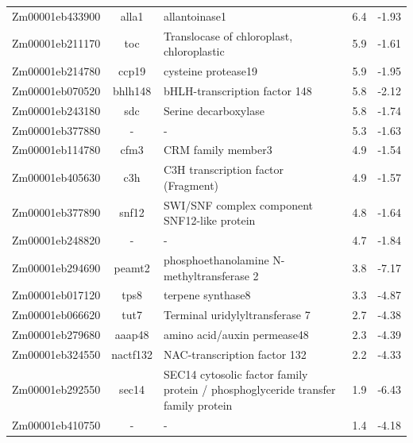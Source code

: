 \documentclass[9pt,twocolumn,twoside]{rilabRxiv}
\begin{document}
\begin{table}[h!]
\begin{tabular}{ccp{7.5cm}cc}
\hline
Zm00001eb433900 & alla1 & allantoinase1 & 6.4 & -1.93\\
Zm00001eb211170 & toc & Translocase of chloroplast, chloroplastic & 5.9 & -1.61\\
Zm00001eb214780 & ccp19 & cysteine protease19 & 5.9 & -1.95\\
Zm00001eb070520 & bhlh148 & bHLH-transcription factor 148 & 5.8 & -2.12\\
Zm00001eb243180 & sdc & Serine decarboxylase & 5.8 & -1.74\\
Zm00001eb377880 & - & - & 5.3 & -1.63\\
Zm00001eb114780 & cfm3 & CRM family member3 & 4.9 & -1.54\\
Zm00001eb405630 & c3h & C3H transcription factor (Fragment) & 4.9 & -1.57\\
Zm00001eb377890 & snf12 & SWI/SNF complex component SNF12-like protein & 4.8 & -1.64\\
Zm00001eb248820 & - & - & 4.7 & -1.84\\
Zm00001eb294690 & peamt2 & phosphoethanolamine N-methyltransferase 2 & 3.8 & -7.17\\
Zm00001eb017120 & tps8 & terpene synthase8 & 3.3 & -4.87\\
Zm00001eb066620 & tut7 & Terminal uridylyltransferase 7 & 2.7 & -4.38\\
Zm00001eb279680 & aaap48 & amino acid/auxin permease48 & 2.3 & -4.39\\
Zm00001eb324550 & nactf132 & NAC-transcription factor 132 & 2.2 & -4.33\\
Zm00001eb292550 & sec14 & SEC14 cytosolic factor family protein / phosphoglyceride transfer family protein & 1.9 & -6.43\\
Zm00001eb410750 & - & - & 1.4 & -4.18\\
\hline
\end{tabular}
\end{table}
\end{document}
